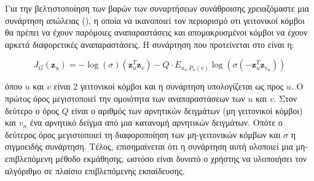 Για την βελτιστοποίηση των βαρών των συναρτήσεων συνάθροισης χρειαζόμαστε μια συνάρτηση
απώλειας (), η οποία να ικανοποιεί τον περιορισμό οτι γειτονικοί κόμβοι
θα πρέπει να έχουν παρόμοιες αναπαραστάσεις και απομακρυσμένοι κόμβοι να έχουν
αρκετά διαφορετικές αναπαραστάσεις. Η συνάρτηση που προτείνεται στο
\cite{GraphSAGE} είναι η:

\begin{equation}
    J_{G}(\boldsymbol{z}_{u}) = -\log(\sigma)(\boldsymbol{z}_{u}^{T}\boldsymbol{z}_{v})
    - Q \cdot E_{u_{n}~P_{n}(v)} \log(\sigma(-\boldsymbol{z}_{u}^{T}\boldsymbol{z}_{v_{n}}))
\end{equation}

όπου \(u\) και \(v\) είναι 2 γειτονικοί κόμβοι και η συνάρτηση υπολογίζεται ως προς \(u\).
Ο πρώτος όρος μεγιστοποιεί την ομοιότητα των αναπαραστάσεων των \(u\) και \(v\). Στον δεύτερο
ο όρος \(Q\) είναι ο αριθμός των αρνητικών δειγμάτων (μη γειτονικοί κόμβοι) και \(v_n\) 
ένα αρνητικό δείγμα από μια κατανομή αρνητικών δειγμάτων. Οπότε ο δεύτερος όρος μεγιστοποιεί
τη διαφοροποίηση των μη-γειτονικών κόμβων και \(\sigma\) η σιγμοειδής συνάρτηση. Τέλος,
επισημαίνεται ότι η συνάρτηση αυτή υλοποιεί μια μη-επιβλεπόμενη μέθοδο εκμάθησης,
ωστόσο είναι δυνατό ο χρήστης να υλοποιήσει τον αλγόριθμο σε πλαίσιο επιβλεπόμενης 
εκπαίδευσης.